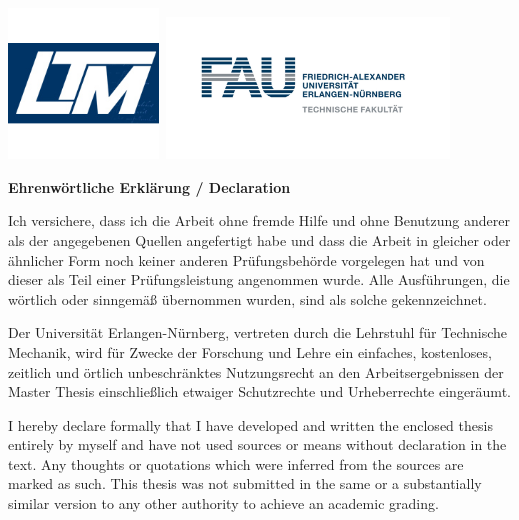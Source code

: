 \documentclass[a4paper,12pt,BCOR0mm,headsepline,final,oneside]{scrbook}
\newcommand{\thethesis}[0]{%
  Master Thesis
}
\begin{document}
\begin{titlepage}
\begin{center}
  \end{center}
  \includegraphics[width=4cm]{ltm.png}\hspace*{4cm}~\includegraphics[width=7.5cm]{logo_fau.jpg}
\end{titlepage}

\clearpage{\pagestyle{empty}\cleardoublepage}

\thispagestyle{empty}
\begin{center}
\Large \textbf{Ehrenw\"ortliche Erkl\"arung / Declaration} \vspace{1cm}\\
\end{center}

Ich versichere, dass ich die Arbeit ohne fremde Hilfe und ohne Benutzung
anderer als der angegebenen Quellen angefertigt habe und dass die Arbeit in
gleicher oder \"ahnlicher Form noch keiner anderen Pr\"ufungsbeh\"orde
vorgelegen hat und von dieser als Teil einer Pr\"ufungsleistung angenommen
wurde. Alle Ausf\"uhrungen, die w\"ortlich oder sinngem\"a\ss{} \"ubernommen
wurden, sind als solche gekennzeichnet.

\vspace{1cm}

Der Universit\"at Erlangen-N\"urnberg, vertreten durch die Lehrstuhl f\"ur Technische Mechanik, wird f\"ur Zwecke der Forschung und Lehre ein einfaches,
kostenloses, zeitlich und \"ortlich unbeschr\"anktes Nutzungsrecht an den
Arbeitsergebnissen der \thethesis einschlie\ss{}lich etwaiger Schutzrechte und
Urheberrechte einger\"aumt.

\vspace{1cm}

I hereby declare formally that I have developed and written the enclosed thesis entirely by myself and have not used sources or means without declaration in the text. Any thoughts or quotations which were inferred from the sources are marked as such. This thesis was not submitted in the same or a substantially similar version to any other authority to achieve an academic grading.
\end{document}
